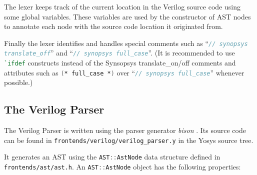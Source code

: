 The lexer keeps track of the current location in the Verilog source code using
some global variables. These variables are used by the constructor of AST nodes
to annotate each node with the source code location it originated from.

\begin{sloppypar}
Finally the lexer identifies and handles special comments such as
``\lstinline[language=Verilog]{// synopsys translate_off}'' and
``\lstinline[language=Verilog]{// synopsys full_case}''. (It is recommended to
use \lstinline[language=Verilog]{`ifdef} constructs instead of the Synsopsys
translate\_on/off comments and attributes such as
\lstinline[language=Verilog]{(* full_case *)} over ``\lstinline[language=Verilog]{// synopsys full_case}''
whenever possible.)
\end{sloppypar}

\subsection{The Verilog Parser}

The Verilog Parser is written using the parser generator {\it bison} . Its source code
can be found in {\tt frontends/verilog/verilog\_parser.y} in the Yosys source tree.

It generates an AST using the \lstinline[language=C++]{AST::AstNode} data structure
defined in {\tt frontends/ast/ast.h}. An \lstinline[language=C++]{AST::AstNode} object has
the following properties:


